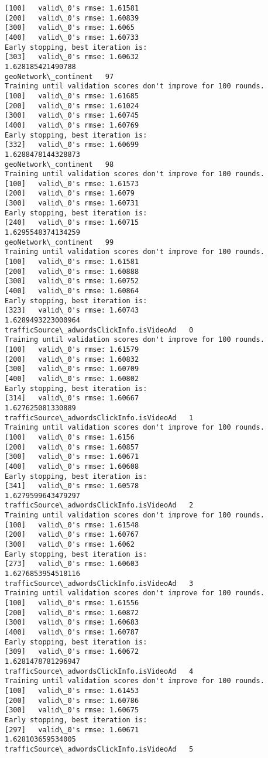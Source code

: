 \documentclass[11pt]{article}
\begin{document}
\begin{Verbatim}[commandchars=\\\{\}]
[100]	valid\_0's rmse: 1.61581
[200]	valid\_0's rmse: 1.60839
[300]	valid\_0's rmse: 1.6065
[400]	valid\_0's rmse: 1.60733
Early stopping, best iteration is:
[303]	valid\_0's rmse: 1.60632
1.628185421490788
geoNetwork\_continent   97
Training until validation scores don't improve for 100 rounds.
[100]	valid\_0's rmse: 1.61685
[200]	valid\_0's rmse: 1.61024
[300]	valid\_0's rmse: 1.60745
[400]	valid\_0's rmse: 1.60769
Early stopping, best iteration is:
[332]	valid\_0's rmse: 1.60699
1.6288478144328873
geoNetwork\_continent   98
Training until validation scores don't improve for 100 rounds.
[100]	valid\_0's rmse: 1.61573
[200]	valid\_0's rmse: 1.6079
[300]	valid\_0's rmse: 1.60731
Early stopping, best iteration is:
[240]	valid\_0's rmse: 1.60715
1.6295548374134259
geoNetwork\_continent   99
Training until validation scores don't improve for 100 rounds.
[100]	valid\_0's rmse: 1.61581
[200]	valid\_0's rmse: 1.60888
[300]	valid\_0's rmse: 1.60752
[400]	valid\_0's rmse: 1.60864
Early stopping, best iteration is:
[323]	valid\_0's rmse: 1.60743
1.6289493223000964
trafficSource\_adwordsClickInfo.isVideoAd   0
Training until validation scores don't improve for 100 rounds.
[100]	valid\_0's rmse: 1.61579
[200]	valid\_0's rmse: 1.60832
[300]	valid\_0's rmse: 1.60709
[400]	valid\_0's rmse: 1.60802
Early stopping, best iteration is:
[314]	valid\_0's rmse: 1.60667
1.627625081330889
trafficSource\_adwordsClickInfo.isVideoAd   1
Training until validation scores don't improve for 100 rounds.
[100]	valid\_0's rmse: 1.6156
[200]	valid\_0's rmse: 1.60857
[300]	valid\_0's rmse: 1.60671
[400]	valid\_0's rmse: 1.60608
Early stopping, best iteration is:
[341]	valid\_0's rmse: 1.60578
1.6279599643479297
trafficSource\_adwordsClickInfo.isVideoAd   2
Training until validation scores don't improve for 100 rounds.
[100]	valid\_0's rmse: 1.61548
[200]	valid\_0's rmse: 1.60767
[300]	valid\_0's rmse: 1.6062
Early stopping, best iteration is:
[273]	valid\_0's rmse: 1.60603
1.6276853954518116
trafficSource\_adwordsClickInfo.isVideoAd   3
Training until validation scores don't improve for 100 rounds.
[100]	valid\_0's rmse: 1.61556
[200]	valid\_0's rmse: 1.60872
[300]	valid\_0's rmse: 1.60683
[400]	valid\_0's rmse: 1.60787
Early stopping, best iteration is:
[309]	valid\_0's rmse: 1.60672
1.6281478781296947
trafficSource\_adwordsClickInfo.isVideoAd   4
Training until validation scores don't improve for 100 rounds.
[100]	valid\_0's rmse: 1.61453
[200]	valid\_0's rmse: 1.60786
[300]	valid\_0's rmse: 1.60675
Early stopping, best iteration is:
[297]	valid\_0's rmse: 1.60671
1.628103659534005
trafficSource\_adwordsClickInfo.isVideoAd   5

\end{Verbatim}
\end{document}
